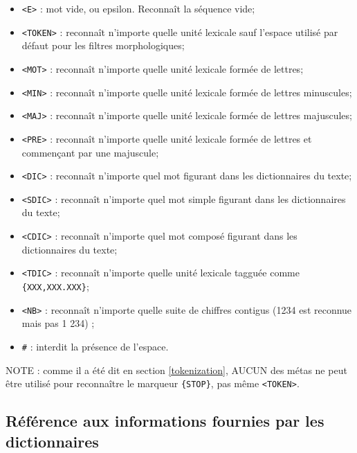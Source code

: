 \bigskip
{}
\index{\verb+#+}
\begin{itemize}
  \item \verb+<E>+ : mot vide, ou epsilon. Reconnaît la séquence vide;
  \item \verb+<TOKEN>+ : reconnaît n’importe quelle unité lexicale sauf l'espace
  	  utilisé par défaut pour les filtres morphologiques;
  \item \verb+<MOT>+ : reconnaît n’importe quelle unité lexicale formée de lettres;
  \item \verb+<MIN>+ : reconnaît n’importe quelle unité lexicale formée de lettres minuscules;
  \item \verb+<MAJ>+ : reconnaît n’importe quelle unité lexicale formée de lettres majuscules;
  \item \verb+<PRE>+ : reconnaît n’importe quelle unité lexicale formée de lettres et commençant par
  	  une
majuscule;
  \item \verb+<DIC>+ : reconnaît n’importe quel mot figurant dans les dictionnaires du texte;
  \item \verb+<SDIC>+ : reconnaît n’importe quel mot simple figurant dans les dictionnaires du
  	  texte;
  \item \verb+<CDIC>+ : reconnaît n’importe quel mot composé figurant dans les dictionnaires du
  	  texte;
  \item \verb+<TDIC>+ : reconnaît n’importe quelle unité lexicale tagguée comme
  	  \verb+{XXX,XXX.XXX}+;
  \item \verb+<NB>+ : reconnaît n’importe quelle suite de chiffres contigus
  	  (1234 est reconnue mais pas 1 234) ;
  \item \verb+#+ : interdit la présence de l'espace.
\end{itemize}

\bigskip
\noindent NOTE : comme il a été dit en section \ref{tokenization}, AUCUN des métas ne peut être utilisé pour reconnaître le marqueur \verb+{STOP}+, pas même \verb+<TOKEN>+.

\subsection{Référence aux informations fournies par les dictionnaires}


